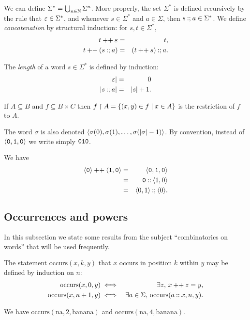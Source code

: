 	We can define $\Sigma^*=\bigcup_{n\in\mathbb{N}}\Sigma^n$.
	More properly, the set $\Sigma^*$ is defined recursively by the rule that $\varepsilon\in\Sigma^*$, and whenever $s\in\Sigma^*$ and $a\in\Sigma$, then
	$s\mathbin{{:}{;}} a\in \Sigma^*$.
	We define \emph{concatenation} by structural induction: for $s,t\in\Sigma^*$,
	\begin{eqnarray*}
		t\mathbin{{+}{+}} \varepsilon		   &=& t,\\
		t\mathbin{{+}{+}} (s \mathbin{{:}{;}} a)   &=& (t\mathbin{{+}{+}} s) \mathbin{{:}{;}} a.
	\end{eqnarray*}
	\begin{definition}\label{df:length}
		The \emph{length} of a word $s\in\Sigma^*$ is defined by induction:
		\begin{eqnarray*}
			\lvert\varepsilon\rvert		   &=& 0\\
			\lvert s \mathbin{{:}{;}} a\rvert	 &=& \lvert s\rvert + 1.
		\end{eqnarray*}
	\end{definition}
	If $A\subseteq B$ and $f\subseteq B\times C$ then $f\upharpoonright A = \{(x,y)\in f\mid x\in A\}$ is the restriction of $f$ to $A$.

	The word $\sigma$ is also denoted $\langle \sigma(0),\sigma(1),\dots,\sigma(\lvert\sigma\rvert-1)\rangle$.
	By convention, instead of $\langle \mathtt 0, \mathtt 1, \mathtt 0\rangle$ we write simply $\mathtt 0\mathtt 1\mathtt 0$.
	\begin{example}
		We have
		\begin{eqnarray*}
			\langle \mathtt 0\rangle \mathbin{{+}{+}} \langle \mathtt 1, \mathtt 0\rangle &=& \langle \mathtt 0, \mathtt 1, \mathtt 0\rangle\\
																	 &=& \mathtt 0 \mathbin{{:}{:}} \langle 1, 0\rangle\\
																	 &=& \langle 0,1\rangle \mathbin{{:}{;}} \langle 0\rangle.\\
		\end{eqnarray*}
	\end{example}
	\subsection{Occurrences and powers}

		In this subsection we state some results from the subject ``combinatorics on words'' that will be used frequently.


		The statement $\mathrm{occurs}(x,k,y)$ that $x$ occurs in position $k$ within $y$ may be defined by induction on $n$:
		\begin{eqnarray*}
			\mathrm{occurs}(x,0,y)  &\iff& \exists z,\, x \mathbin{{+}{+}} z =y,\\
			\mathrm{occurs}(x,n+1,y)&\iff& \exists a\in\Sigma,\, \mathrm{occurs}(a\mathbin{{:}{:}} x,n,y).
		\end{eqnarray*}
		\begin{example}\label{janani-suggest}
			We have $\mathrm{occurs}(\mathrm{na}, 2, \mathrm{banana})$ and $\mathrm{occurs}(\mathrm{na},4,\mathrm{banana})$.
		\end{example}

